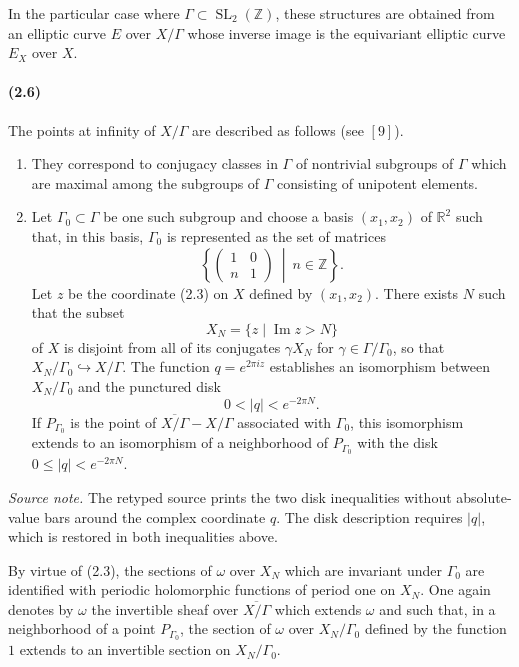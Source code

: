 \documentclass[10pt]{article}
\newcommand{\R}{\mathbb R}
\newcommand{\Z}{\mathbb Z}
\newcommand{\SL}{\operatorname{SL}}
\begin{document}
In the particular case where $\Gamma\subset\SL_2(\Z)$, these structures are obtained
from an elliptic curve $E$ over $X/\Gamma$ whose inverse image is the equivariant elliptic
curve $E_X$ over $X$.

\paragraph{(2.6)}
The points at infinity of $X/\Gamma$ are described as follows (see \([9]\)).

\begin{enumerate}[label=(\alph*)]
\item They correspond to conjugacy classes in $\Gamma$ of nontrivial subgroups of
$\Gamma$ which are maximal among the subgroups of $\Gamma$ consisting of unipotent
elements.

\item Let $\Gamma_0\subset \Gamma$ be one such subgroup and choose a basis $(x_1,x_2)$
of $\R^2$ such that, in this basis, $\Gamma_0$ is represented as the set of matrices
\[
\left\{\begin{pmatrix}1&0\\ n&1\end{pmatrix}\ \middle|\ n\in\Z\right\}.
\]
Let $z$ be the coordinate (2.3) on $X$ defined by $(x_1,x_2)$. There exists $N$ such that
the subset
\[
X_N=\{z\mid \operatorname{Im}z>N\}
\]
of $X$ is disjoint from all of its conjugates $\gamma X_N$ for $\gamma\in\Gamma/\Gamma_0$,
so that $X_N/\Gamma_0\hookrightarrow X/\Gamma$. The function
$q=e^{2\pi iz}$ establishes an isomorphism between $X_N/\Gamma_0$ and the punctured
disk
\[
0<|q|<e^{-2\pi N}.
\]
If $P_{\Gamma_0}$ is the point of $\overline{X/\Gamma}-X/\Gamma$ associated with
$\Gamma_0$, this isomorphism extends to an isomorphism of a neighborhood of
$P_{\Gamma_0}$ with the disk $0\le |q|<e^{-2\pi N}$.
\end{enumerate}

\noindent\emph{Source note.} The retyped source prints the two disk inequalities without
absolute-value bars around the complex coordinate $q$. The disk description requires
$|q|$, which is restored in both inequalities above.

By virtue of (2.3), the sections of $\omega$ over $X_N$ which are invariant under
$\Gamma_0$ are identified with periodic holomorphic functions of period one on $X_N$.
One again denotes by $\omega$ the invertible sheaf over $\overline{X/\Gamma}$ which
extends $\omega$ and such that, in a neighborhood of a point $P_{\Gamma_0}$, the section
of $\omega$ over $X_N/\Gamma_0$ defined by the function $1$ extends to an invertible
section on $X_N/\Gamma_0$.
\end{document}
